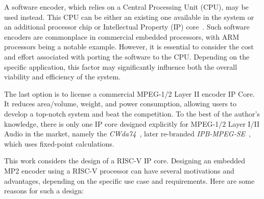 A software encoder, which relies on a Central Processing Unit (CPU), may be used instead. This CPU can be either an existing one available in the system or an additional processor chip or Intellectual Property (IP) core~\cite{ipcore}. Such software encoders are commonplace in commercial embedded processors, with ARM processors being a notable example. However, it is essential to consider the cost and effort associated with porting the software to the CPU. Depending on the specific application, this factor may significantly influence both the overall viability and efficiency of the system.

The last option is to license a commercial MPEG-1/2 Layer II encoder IP Core. It reduces area/volume, weight, and power consumption, allowing users to develop a top-notch system and beat the competition. To the best of the author's knowledge, there is only one IP core designed explicitly for MPEG-1/2 Layer I/II Audio in the market, namely the \textit{CWda74}~\cite{CWda74}, later re-branded \textit{IPB-MPEG-SE}~\cite{ipb-mpeg-se}, which uses fixed-point calculations.

This work considers the design of a RISC-V IP core. Designing an embedded MP2 encoder using a RISC-V processor can have several motivations and advantages, depending on the specific use case and requirements. Here are some reasons for such a design:


